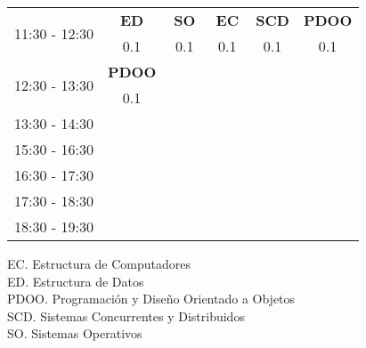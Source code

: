 \documentclass[10pt,spanish, landscape]{article}
\begin{document}
\begin{minipage}{0.7\textwidth}
\begin{tabular}{|c|ccc|ccc|ccc|ccc|ccc|}
 \hline
\multirow{2}{*}{11:30 - 12:30} & \multicolumn{3}{|c|}{ \cellcolor{grisclaro} \textbf{ED}}& \multicolumn{3}{|c|}{ \cellcolor{grisclaro} \textbf{SO}}& \multicolumn{3}{|c|}{ \cellcolor{grisclaro} \textbf{EC}}& \multicolumn{3}{|c|}{ \cellcolor{grisclaro} \textbf{SCD}}& \multicolumn{3}{|c|}{ \cellcolor{grisclaro} \textbf{PDOO}}\\ 
& \multicolumn{3}{|c|}{ \cellcolor{grisclaro} {\footnotesize 0.1}}& \multicolumn{3}{|c|}{ \cellcolor{grisclaro} {\footnotesize 0.1}}& \multicolumn{3}{|c|}{ \cellcolor{grisclaro} {\footnotesize 0.1}}& \multicolumn{3}{|c|}{ \cellcolor{grisclaro} {\footnotesize 0.1}}& \multicolumn{3}{|c|}{ \cellcolor{grisclaro} {\footnotesize 0.1}}\\ 
 \hline
\multirow{2}{*}{12:30 - 13:30} & \multicolumn{3}{|c|}{ \cellcolor{grisclaro} \textbf{PDOO}} &  &  &  &  &  &  &  &  &  &  &  & \\ 
& \multicolumn{3}{|c|}{ \cellcolor{grisclaro} {\footnotesize 0.1}} &  &  &  &  &  &  &  &  &  &  &  & \\ 
 \hline
\multirow{2}{*}{13:30 - 14:30}  &  &  &  &  &  &  &  &  &  &  &  &  &  &  & \\ 
 &  &  &  &  &  &  &  &  &  &  &  &  &  &  & \\ 
 \hline
\multirow{2}{*}{15:30 - 16:30}  &  &  &  &  &  &  &  &  &  &  &  &  &  &  & \\ 
 &  &  &  &  &  &  &  &  &  &  &  &  &  &  & \\ 
 \hline
\multirow{2}{*}{16:30 - 17:30}  &  &  &  &  &  &  &  &  &  &  &  &  &  &  & \\ 
 &  &  &  &  &  &  &  &  &  &  &  &  &  &  & \\ 
 \hline
\multirow{2}{*}{17:30 - 18:30}  &  &  &  &  &  &  &  &  &  &  &  &  &  &  & \\ 
 &  &  &  &  &  &  &  &  &  &  &  &  &  &  & \\ 
 \hline
\multirow{2}{*}{18:30 - 19:30}  &  &  &  &  &  &  &  &  &  &  &  &  &  &  & \\ 
 &  &  &  &  &  &  &  &  &  &  &  &  &  &  & \\ 
 \hline

\end{tabular}
\end{minipage}
\begin{minipage}{0.25\textwidth}
EC. Estructura de Computadores\\[0.5cm]
ED. Estructura de Datos\\[0.5cm]
PDOO. Programación y Diseño Orientado a Objetos\\[0.5cm]
SCD. Sistemas Concurrentes y Distribuidos\\[0.5cm]
SO. Sistemas Operativos\\[0.5cm]
\end{minipage}
\newpage
\end{document}
